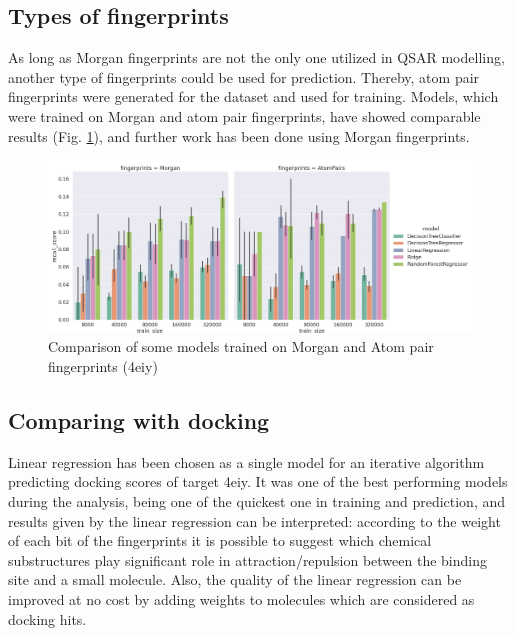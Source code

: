 \hfill\break
\subsection{Types of fingerprints}

As long as Morgan fingerprints are not the only one utilized in QSAR modelling, another type of fingerprints could be used for prediction. 
Thereby, atom pair fingerprints were generated for the dataset and used for training. 
Models, which were trained on Morgan and atom pair fingerprints, have showed comparable results (Fig. \ref{MvsAP}), and further work has been done using Morgan fingerprints.

\begin{figure}[H]
    \centering
    \includegraphics[width=\linewidth]{Images/MorganVSAtomPairs.jpg}
    \caption{Comparison of some models trained on Morgan and Atom pair fingerprints (4eiy)}
    \label{MvsAP}
\end{figure}



\hfill\break
\subsection{Comparing with docking}

Linear regression has been chosen as a single model for an iterative algorithm predicting docking scores of target 4eiy. 
It was one of the best performing models during the analysis, being one of the quickest one in training and prediction, and results given by the linear regression can be interpreted: according to the weight of each bit of the fingerprints it is possible to suggest which chemical substructures play significant role in attraction/repulsion between the binding site and a small molecule. 
Also, the quality of the linear regression can be improved at no cost by adding weights to molecules which are considered as docking hits.\\


